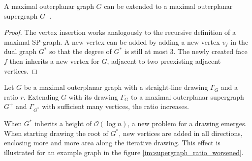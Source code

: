 \begin{lemma}
	A maximal outerplanar graph $G$ can be extended to a maximal outerplanar supergraph $G^+$.\label{l:outerplanar-supergraph}
\end{lemma}
\begin{proof}
	The vertex insertion works analogously to the recursive definition of a maximal SP-graph. A new vertex can be added by adding a new vertex $v_f$ in the dual graph $G^*$ so that the degree of $G^*$ is still at most 3. The newly created face $f$ then inherits a new vertex for $G$, adjacent to two preexisting adjacent vertices.
\end{proof}

\begin{observation}
	Let $G$ be a maximal outerplanar graph with a straight-line drawing $\Gamma_{G}$ and a ratio $r$. Extending $G$ with its drawing $\Gamma_G$ to a maximal outerplanar supergraph $G^+$ and $\Gamma_{G^*}$ with sufficient many vertices, the ratio increases.\label{ob:area_leads_to_ratio_increase}
\end{observation}
When $G^*$ inherits a height of $\mathcal{O}(\log n)$, a new problem for a drawing emerges. When starting drawing the root of $G^*$, new vertices are added in all directions, enclosing more and more area along the iterative drawing. This effect is illustrated for an example graph in the figure \ref{im:supergraph_ratio_worsened}.
